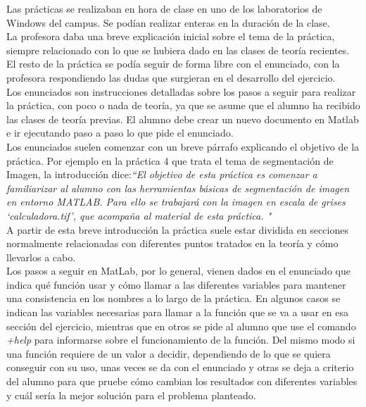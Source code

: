 \documentclass[a4paper,12pt]{report}
\begin{document}
Las prácticas se realizaban en hora de clase en uno de los laboratorios de Windows del campus. Se podían realizar enteras en la duración de la clase. \\

La profesora daba una breve explicación inicial sobre el tema de la práctica, siempre relacionado con lo que se hubiera dado en las clases de teoría recientes. El resto de la práctica se podía seguir de forma libre con el enunciado, con la profesora respondiendo las dudas que surgieran en el desarrollo del ejercicio. \\

Los enunciados son instrucciones detalladas sobre los pasos a seguir para realizar la práctica, con poco o nada de teoría, ya que se asume que el alumno ha recibido las clases de teoría previas. El alumno debe crear un nuevo documento en Matlab e ir ejecutando paso a paso lo que pide el enunciado. \\

Los enunciados suelen comenzar con un breve párrafo explicando el objetivo de la práctica. Por ejemplo en la práctica 4 que trata el tema de segmentación de Imagen, la introducción dice:\emph{``El objetivo de esta práctica es comenzar a familiarizar al alumno con las herramientas básicas de segmentación de imagen en entorno MATLAB. Para ello se trabajará con la imagen en escala de
grises ‘calculadora.tif’, que acompaña al material de esta práctica. "}\\

A partir de esta breve introducción la práctica suele estar dividida en secciones normalmente relacionadas con diferentes puntos tratados en la teoría y cómo llevarlos a cabo.\\

Los pasos a seguir en MatLab, por lo general, vienen dados en el enunciado que indica qué función usar y cómo llamar a las diferentes variables para mantener una consistencia en los nombres a lo largo de la práctica. En algunos casos se indican las variables necesarias para llamar a la función que se va a usar en esa sección del ejercicio, mientras que en otros se pide al alumno que use el comando \textsl{+help} para informarse sobre el funcionamiento de la función. Del mismo modo si una función requiere de un valor a decidir, dependiendo de lo que se quiera conseguir con su uso, unas veces se da con el enunciado y otras se deja a criterio del alumno para que pruebe cómo cambian los resultados con diferentes variables y cuál sería la mejor solución para el problema planteado.\\
\end{document}
